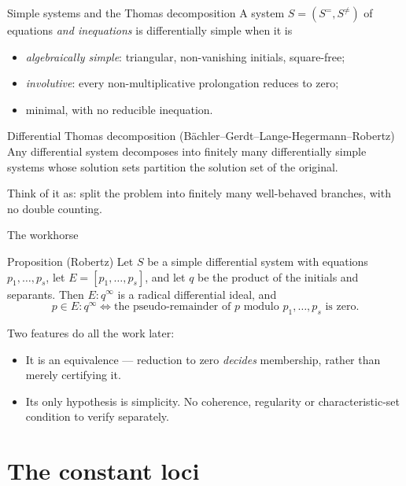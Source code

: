 \documentclass[10pt,aspectratio=169]{beamer}
\begin{document}
\begin{frame}{Simple systems and the Thomas decomposition}
A system $S = (S^{=}, S^{\neq})$ of equations \emph{and inequations} is
\alert{differentially simple} when it is
\begin{itemize}
  \item \emph{algebraically simple}: triangular, non-vanishing initials,
        square-free;
  \item \emph{involutive}: every non-multiplicative prolongation reduces to zero;
  \item minimal, with no reducible inequation.
\end{itemize}

\pause
\begin{block}{Differential Thomas decomposition (B\"achler--Gerdt--Lange-Hegermann--Robertz)}
Any differential system decomposes into finitely many differentially simple
systems whose solution sets \alert{partition} the solution set of the original.
\end{block}

\pause
\medskip
Think of it as: split the problem into finitely many well-behaved branches, with
no double counting.
\end{frame}

\begin{frame}{The workhorse}
\begin{block}{Proposition (Robertz)}
Let $S$ be a simple differential system with equations $p_{1},\dots,p_{s}$, let
$E = [p_{1},\dots,p_{s}]$, and let $q$ be the product of the initials and
separants. Then $E : q^{\infty}$ is a \alert{radical} differential ideal, and
\[
  p \in E : q^{\infty}
  \iff
  \text{the pseudo-remainder of $p$ modulo $p_{1},\dots,p_{s}$ is zero.}
\]
\end{block}

\pause
\bigskip
Two features do all the work later:
\begin{itemize}
  \item It is an \alert{equivalence} --- reduction to zero \emph{decides}
        membership, rather than merely certifying it.
  \item Its only hypothesis is \alert{simplicity}. No coherence, regularity or
        characteristic-set condition to verify separately.
\end{itemize}
\end{frame}


\section{The constant loci}
\end{document}
